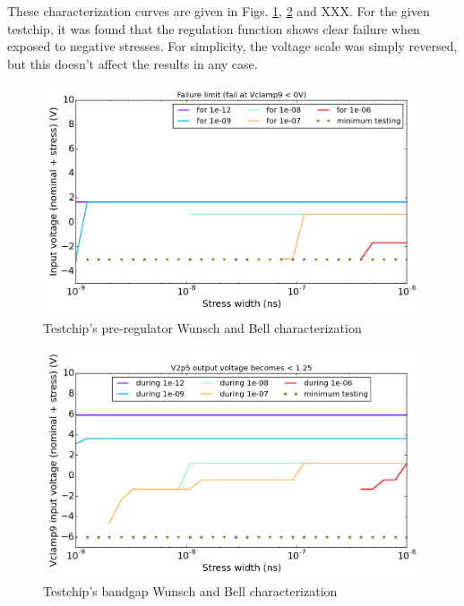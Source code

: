 These characterization curves are given in Figs. \ref{pre_regu_wb}, \ref{bandgap_wb} and XXX.
For the given testchip, it was found that the regulation function shows clear failure when exposed to negative stresses.
For simplicity, the voltage scale was simply reversed, but this doesn't affect the results in any case.


\begin{figure}[!htbp]
  \centering
  \includegraphics[width=\textwidth]{src/4/figures/cz_vpre.png}
  \caption{Testchip's pre-regulator Wunsch and Bell characterization}
  \label{pre_regu_wb}
\end{figure}

\begin{figure}[!htbp]
  \centering
  \includegraphics[width=\textwidth]{src/4/figures/cz_bandgap.png}
  \caption{Testchip's bandgap Wunsch and Bell characterization}
  \label{bandgap_wb}
\end{figure}


